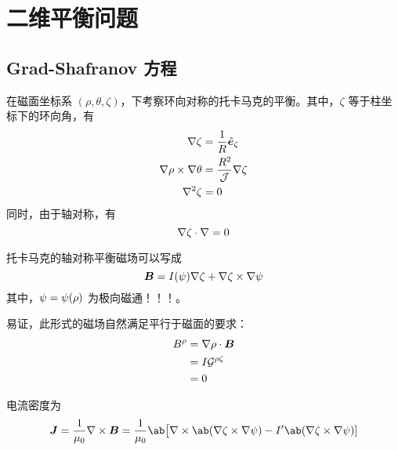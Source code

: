 \section{二维平衡问题}

\subsection{Grad-Shafranov 方程}

在磁面坐标系 $(\rho, \theta, \zeta)$，下考察环向对称的托卡马克的平衡。其中，$\zeta$ 等于柱坐标下的环向角，有
\begin{subequations}\begin{align}
\nabla {\zeta} &= \frac{1}{R} \hat{\bm{e}}_\zeta \\
\nabla {\rho} \times \nabla {\theta} &= \frac{R^2}{\mathcal{J}} \nabla {\zeta} \\
\nabla^2 {\zeta} &= 0
\end{align}\end{subequations}
同时，由于轴对称，有
\begin{equation}
\nabla {\zeta} \cdot \nabla {} = 0
\end{equation}

托卡马克的轴对称平衡磁场可以写成
\begin{equation}
\bm{B} = I(\psi) \nabla {\zeta}
+ \nabla {\zeta} \times \nabla {\psi}
\end{equation}
其中，$\psi = \psi(\rho)$ 为极向磁通！！！。

易证，此形式的磁场自然满足平行于磁面的要求：
\begin{equation}\begin{aligned}
B^\rho &= \nabla {\rho} \cdot \bm{B} \\
&= I {\mathcal{G}}^{\rho\zeta} \\
&= 0
\end{aligned}\end{equation}

电流密度为
\begin{equation}
\vector{J} = \frac{1}{\mu_0} \curl{\vector{B}} =
\frac{1}{\mu_0} \ab\big[
    \curl{\ab(\grad{\zeta} \times \grad{\ToroidalFlux})}
    - I' \ab(\grad{\zeta} \times \grad{\ToroidalFlux})
]
\end{equation}

